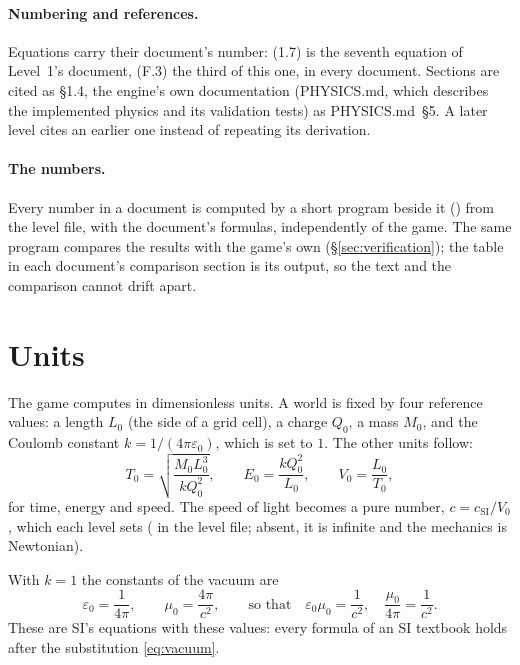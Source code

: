 \documentclass{leveldoc}
\begin{document}
\paragraph{Numbering and references.} Equations carry their document's number: (1.7) is the
seventh equation of Level~1's document, (F.3) the third of this one, in every document.
Sections are cited as §1.4, the engine's own documentation (\textsf{PHYSICS.md}, which
describes the implemented physics and its validation tests) as \textsf{PHYSICS.md}~§5.
A later level cites an earlier one instead of repeating its derivation.

\paragraph{The numbers.} Every number in a document is computed by a short program beside it
() from the level file, with the document's formulas, independently of the
game. The same program compares the results with the game's own (§\ref{sec:verification});
the table in each document's comparison section is its output, so the text and the
comparison cannot drift apart.

\section{Units}\label{sec:units}

The game computes in dimensionless units. A world is fixed by four reference values: a length
$L_0$ (the side of a grid cell), a charge $Q_0$, a mass $M_0$, and the Coulomb constant
$k = 1/(4\pi\varepsilon_0)$, which is set to $1$. The other units follow:
\begin{equation}\label{eq:units}
  T_0 = \sqrt{\frac{M_0 L_0^3}{k Q_0^2}}, \qquad
  E_0 = \frac{k Q_0^2}{L_0}, \qquad
  V_0 = \frac{L_0}{T_0},
\end{equation}
for time, energy and speed. The speed of light becomes a pure number, $c = c_{\mathrm{SI}}/V_0$,
which each level sets ( in the level file; absent, it is infinite and the
mechanics is Newtonian).

With $k = 1$ the constants of the vacuum are
\begin{equation}\label{eq:vacuum}
  \varepsilon_0 = \frac{1}{4\pi}, \qquad \mu_0 = \frac{4\pi}{c^2}, \qquad
  \text{so that}\quad \varepsilon_0\mu_0 = \frac{1}{c^2}, \quad \frac{\mu_0}{4\pi} = \frac{1}{c^2}.
\end{equation}
These are SI's equations with these values: every formula of an SI textbook holds after
the substitution \eqref{eq:vacuum}.
\end{document}
